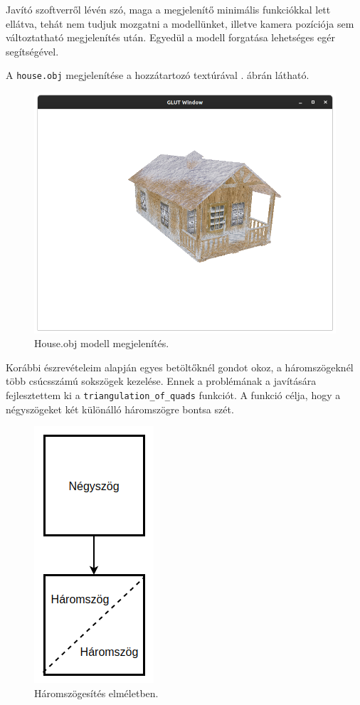 Javító szoftverről lévén szó, maga a megjelenítő minimális funkciókkal lett ellátva, tehát nem tudjuk mozgatni  a modellünket, illetve kamera pozíciója sem változtatható megjelenítés után. Egyedül a modell forgatása lehetséges egér segítségével.

A \texttt{house.obj} megjelenítése a hozzátartozó textúrával . ábrán látható.
\bigskip

\begin{figure}[h]
\centering
\includegraphics[width=\textwidth]{images/demo.png}
\caption{House.obj modell megjelenítés.}
\label{fig:demo}
\end{figure}
\newpage
{}


Korábbi észrevételeim alapján egyes betöltőknél gondot okoz, a háromszögeknél több csúcsszámú sokszögek kezelése. Ennek a problémának a javítására fejlesztettem ki a \texttt{triangulation\_of\_quads} funkciót. A funkció célja, hogy a négyszögeket két különálló  háromszögre bontsa szét.

\begin{figure}[h]
\centering
\includegraphics[scale=0.39]{images/triangulation.png}
\caption{Háromszögesítés elméletben.}
\label{fig:tri}
\end{figure}

